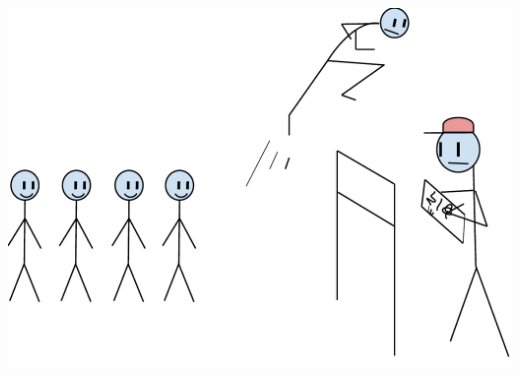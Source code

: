 \documentclass{beamer}
\begin{document}
\begin{frame}
\begin{columns}
\begin{column}{0.3\textwidth}
			\includegraphics[height=.7\textwidth]{Illustrations/fitness_test.PDF}
		\end{column}
		\end{columns}
\end{frame}
\end{document}
